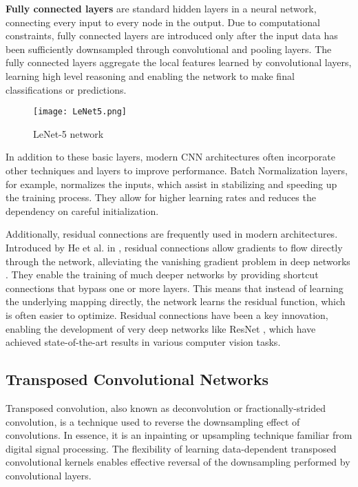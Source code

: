 \documentclass[../../thesis.tex]{subfiles}
\begin{document}
\textbf{Fully connected layers} are standard hidden layers in a neural network, connecting every input to every node in the output. Due to computational constraints, fully connected layers are introduced only after the input data has been sufficiently downsampled through convolutional and pooling layers. The fully connected layers aggregate the local features learned by convolutional layers, learning high level reasoning and enabling the network to make final classifications or predictions.\newline

\begin{figure}[h]
    \centering
    \texttt{[image: LeNet5.png]}
    \caption{LeNet-5 network \cite{LeCun1989ConvNet}}
    \label{fig:LeNet5}
\end{figure}

In addition to these basic layers, modern CNN architectures often incorporate other techniques and layers to improve performance. Batch Normalization layers, for example, normalizes the inputs, which assist in stabilizing and speeding up the training process. They allow for higher learning rates and reduces the dependency on careful initialization.\newline

Additionally, residual connections are frequently used in modern architectures. Introduced by He et al. in \cite{he2015deep}, residual connections allow gradients to flow directly through the network, alleviating the vanishing gradient problem in deep networks \cite{279181}. They enable the training of much deeper networks by providing shortcut connections that bypass one or more layers. This means that instead of learning the underlying mapping directly, the network learns the residual function, which is often easier to optimize. Residual connections have been a key innovation, enabling the development of very deep networks like ResNet \cite{he2015deep}, which have achieved state-of-the-art results in various computer vision tasks.

\subsection{Transposed Convolutional Networks}
Transposed convolution, also known as deconvolution or fractionally-strided convolution, is a technique used to reverse the downsampling effect of convolutions. In essence, it is an inpainting or upsampling technique familiar from digital signal processing. The flexibility of learning data-dependent transposed convolutional kernels enables effective reversal of the downsampling performed by convolutional layers.\newline
\end{document}
